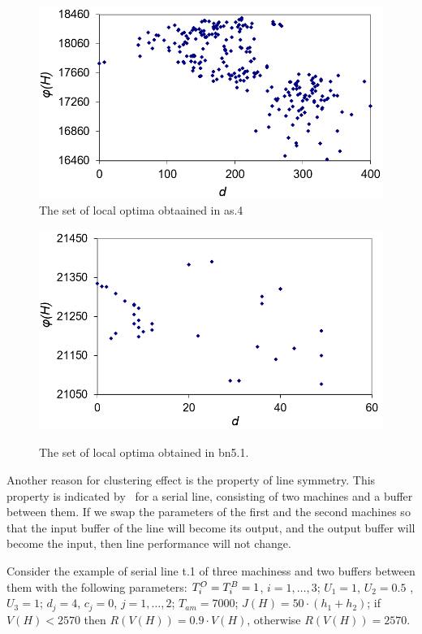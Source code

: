 \documentclass{ifacconf}
\begin{document}
 \begin{figure}[h!]
	\centering
	\includegraphics[scale=0.5]{multistart_klaster}
  \caption{The set of local optima obtaained in as.4 } \label{fig:multistart_klaster}
  \end{figure}
\begin{figure}[h!]
	\begin{center}
		\includegraphics[scale=0.5]{klaster_bn5_1.png}\\
		\caption{The set of  local optima obtained in bn5.1.} \label{klaster_bn5_1}
	\end{center}
\end{figure} 

Another reason for clustering effect is the property of
line symmetry. This property is indicated by~\cite{LP} for a serial line,
consisting of two machines and a buffer
between them. If we swap the parameters of the first and the second machines so 
that the input buffer of the line will become its output, and the output buffer will become the input, then
line performance will not change.

Consider the example of serial line t.1 of
three machiness and two buffers between them with the following parameters: ${T^{\rm O}_i=T^{\rm B}_i=1}$, $i = 1,\ldots,3$;
 ${U_1=1}$, ${U_2=0.5}$ , ${U_3=1}$;
 ${d_j=4}$, ${c_j=0}$, $j = 1,\ldots,2$;
 $T_{am}=7000$;
 $J(H)=50\cdot(h_1+h_2)$;
 if $V(H) < 2570$ then $R(V(H))=0.9\cdot V(H)$, otherwise $R(V(H))=2570$.
\end{document}
